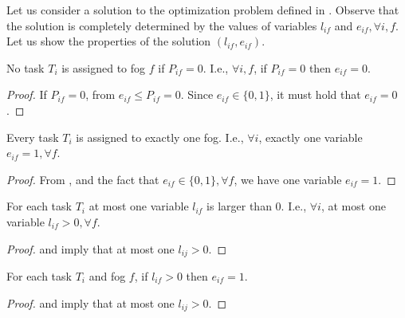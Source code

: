 Let us consider a solution to the optimization problem defined in . Observe that the solution is completely determined by the values of variables $l_{if}$ and $e_{if}, \forall i,f$.
Let us show the properties of the solution $(l_{if}, e_{if})$.

\begin{lemma}
\label{lem:pif}
        No task $T_i$ is assigned to fog $f$ if $P_{if}=0$. I.e., $\forall i,f$, if $P_{if}=0$ then $e_{if} = 0$.
\end{lemma}
\begin{proof}
If $P_{if}=0$, from  $e_{if} \leq P_{if}= 0$. Since $e_{if} \in \{0,1\}$, it must hold that $e_{if} = 0$. 
\end{proof}

\begin{lemma}
\label{lem:eif}
    Every task $T_i$ is assigned to exactly one fog. I.e., $\forall i$, exactly one variable $e_{if}=1, \forall f$.
\end{lemma}
\begin{proof}
From , and the fact that $e_{if} \in \{0,1\}, \forall f$, 
we have one variable $e_{if}=1$. 
\end{proof}

\begin{lemma}
\label{lem:lifnozero}
For each task $T_i$ at most one variable $l_{if}$ is larger than 0. I.e., $\forall i$, at most one variable $l_{if} > 0, \forall f$.
\end{lemma}
\begin{proof}
 and  imply that at most one $l_{ij}>0$.
\end{proof}

\begin{lemma}
\label{lem:ewhenl}
For each task $T_i$ and fog $f$, if $l_{if}>0$ then $e_{if} = 1$.
\end{lemma}
\begin{proof}
 and  imply that at most one $l_{ij}>0$.
\end{proof}

